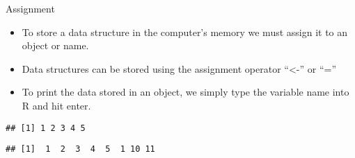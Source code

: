 \begin{frame}[fragile]{Assignment}
\protect\hypertarget{assignment}{}

\begin{itemize}
\tightlist
\item
  To store a data structure in the computer's memory we must assign it
  to an object or name.
\item
  Data structures can be stored using the assignment operator
  ``\textless-'' or ``=''
\end{itemize}

\begin{Shaded}
\begin{Highlighting}[]
\StringTok{ }\OperatorTok{:}
\end{Highlighting}
\end{Shaded}

\begin{itemize}
\tightlist
\item
  To print the data stored in an object, we simply type the variable
  name into R and hit enter.
\end{itemize}

\begin{Shaded}
\begin{Highlighting}[]
\end{Highlighting}
\end{Shaded}

\begin{verbatim}
## [1] 1 2 3 4 5
\end{verbatim}

\begin{Shaded}
\begin{Highlighting}[]
\StringTok{ }\NormalTok{(}\NormalTok{, }\NormalTok{, }\NormalTok{)}
\StringTok{ }
\end{Highlighting}
\end{Shaded}

\begin{verbatim}
## [1]  1  2  3  4  5  1 10 11
\end{verbatim}

\end{frame}

